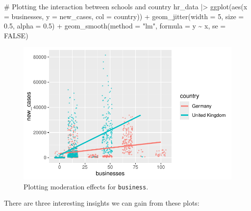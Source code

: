 \documentclass[
  letterpaper,
]{krantz}
\makeatletter
\newenvironment{Shaded}{\begin{snugshade}}{\end{snugshade}}
\newcommand{\AttributeTok}[1]{\textcolor[rgb]{0.40,0.45,0.13}{#1}}
\newcommand{\CommentTok}[1]{\textcolor[rgb]{0.37,0.37,0.37}{#1}}
\newcommand{\ConstantTok}[1]{\textcolor[rgb]{0.56,0.35,0.01}{#1}}
\newcommand{\DecValTok}[1]{\textcolor[rgb]{0.68,0.00,0.00}{#1}}
\newcommand{\FloatTok}[1]{\textcolor[rgb]{0.68,0.00,0.00}{#1}}
\newcommand{\FunctionTok}[1]{\textcolor[rgb]{0.28,0.35,0.67}{#1}}
\newcommand{\NormalTok}[1]{\textcolor[rgb]{0.00,0.23,0.31}{#1}}
\newcommand{\SpecialCharTok}[1]{\textcolor[rgb]{0.37,0.37,0.37}{#1}}
\newcommand{\StringTok}[1]{\textcolor[rgb]{0.13,0.47,0.30}{#1}}
\newenvironment{kframe}{%
\medskip{}
\setlength{\fboxsep}{.8em}
 \def\at@end@of@kframe{}%
 \ifinner\ifhmode%
  \def\at@end@of@kframe{\end{minipage}}%
  \begin{minipage}{\columnwidth}%
 \fi\fi%
 \def\FrameCommand##1{\hskip\@totalleftmargin \hskip-\fboxsep
 \colorbox{shadecolor}{##1}\hskip-\fboxsep
     \hskip-\linewidth \hskip-\@totalleftmargin \hskip\columnwidth}%
 \MakeFramed {\advance\hsize-\width
   \@totalleftmargin\z@ \linewidth\hsize
   \@setminipage}}%
 {\par\unskip\endMakeFramed%
 \at@end@of@kframe}
\renewenvironment{Shaded}{\begin{kframe}}{\end{kframe}}
\makeatother
\begin{document}
\begin{Shaded}
\begin{Highlighting}[]
\CommentTok{\# Plotting the interaction between schools and country}
\NormalTok{hr\_data }\SpecialCharTok{|\textgreater{}}
  \FunctionTok{ggplot}\NormalTok{(}\FunctionTok{aes}\NormalTok{(}\AttributeTok{x =}\NormalTok{ businesses,}
             \AttributeTok{y =}\NormalTok{ new\_cases,}
             \AttributeTok{col =}\NormalTok{ country)) }\SpecialCharTok{+}
  \FunctionTok{geom\_jitter}\NormalTok{(}\AttributeTok{width =} \DecValTok{5}\NormalTok{,}
              \AttributeTok{size =} \FloatTok{0.5}\NormalTok{,}
              \AttributeTok{alpha =} \FloatTok{0.5}\NormalTok{) }\SpecialCharTok{+}
  \FunctionTok{geom\_smooth}\NormalTok{(}\AttributeTok{method =} \StringTok{"lm"}\NormalTok{,}
              \AttributeTok{formula =}\NormalTok{ y }\SpecialCharTok{\textasciitilde{}}\NormalTok{ x,}
              \AttributeTok{se =} \ConstantTok{FALSE}\NormalTok{)}
\end{Highlighting}
\end{Shaded}

\begin{figure}[H]

{\centering \includegraphics{13_regressions_files/figure-pdf/plotting-moderation-effects-businesses-1.pdf}

}

\caption{Plotting moderation effects for \texttt{business}.}

\end{figure}%

There are three interesting insights we can gain from these plots:
\end{document}

